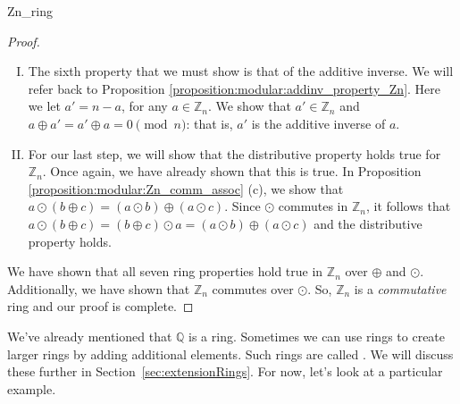 \begin{example}{Zn_ring}
\begin{proof}
\begin{enumerate}[(I)]
$a \odot b    =  b \odot a$, for all $a,b\in{\mathbb Z}_n$.  Note that for a set to be a ring, we only need to show that commutativity of \emph{addition} holds.  Because commutativity of \emph{multiplication} also holds for ${\mathbb Z}_n$, we may also have a \emph{commutative} ring.  Let's continue with our proof that ${\mathbb Z}_n$ is a ring before we jump to that conclusion.
\item The sixth property that we must show is that of the additive inverse.  We will refer back to Proposition \ref{proposition:modular:addinv_property_Zn}.  Here we let $a' = n-a$, for any $a\in{\mathbb Z}_n$.  We show that $a'\in{\mathbb Z}_n$ and $a \oplus a' = a' \oplus a  = 0 \pmod{ n}$: that is, $a'$ is the additive inverse of $a$.
\item For our last step, we will show that the distributive property holds true for ${\mathbb Z}_n$. Once again, we have already shown that this is true.  In Proposition \ref{proposition:modular:Zn_comm_assoc} (c), we show that $a \odot (b \oplus c)  = (a \odot b)\oplus (a \odot c)$.  Since $\odot$ commutes in ${\mathbb Z}_n$, it follows that $a \odot (b \oplus c)  = (b \oplus c) \odot a= (a \odot b)\oplus (a \odot c)$ and the distributive property holds.
\end{enumerate}
We have shown that all seven ring properties hold true in ${\mathbb Z}_n$ over $\oplus$ and $\odot$. Additionally, we have shown that ${\mathbb Z}_n$ commutes over $\odot$.  So, ${\mathbb Z}_n$ is a \emph{commutative} ring and our proof is complete.
\end{proof}
\end{example}

We've already mentioned that ${\mathbb Q}$ is a ring. Sometimes we can use rings to create larger rings by adding additional elements. Such rings are called . We will discuss these further in Section~\ref{sec:extensionRings}. For now, let's look at a particular example.

